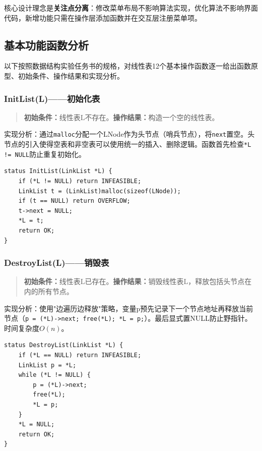 \documentclass[supercite]{Experimental_Report}
\begin{document}
核心设计理念是\textbf{关注点分离}：修改菜单布局不影响算法实现，优化算法不影响界面代码，新增功能只需在操作层添加函数并在交互层注册菜单项。

\subsection{基本功能函数分析}

以下按照数据结构实验任务书的规格，对线性表12个基本操作函数逐一给出函数原型、初始条件、操作结果和实现分析。

\subsubsection{InitList(L)——初始化表}

\begin{quote}\small
\textbf{初始条件：}线性表L不存在。\quad\textbf{操作结果：}构造一个空的线性表。
\end{quote}

实现分析：通过\texttt{malloc}分配一个LNode作为头节点（哨兵节点），将\texttt{next}置空。头节点的引入使得空表和非空表可以使用统一的插入、删除逻辑。函数首先检查\texttt{*L != NULL}防止重复初始化。

\begin{lstlisting}[label={lst:init}, caption={InitList}]
status InitList(LinkList *L) {
    if (*L != NULL) return INFEASIBLE;
    LinkList t = (LinkList)malloc(sizeof(LNode));
    if (t == NULL) return OVERFLOW;
    t->next = NULL;
    *L = t;
    return OK;
}
\end{lstlisting}



\subsubsection{DestroyList(L)——销毁表}


\begin{quote}\small
\textbf{初始条件：}线性表L已存在。\quad\textbf{操作结果：}销毁线性表L，释放包括头节点在内的所有节点。
\end{quote}

实现分析：使用"边遍历边释放"策略，变量p预先记录下一个节点地址再释放当前节点（\texttt{p = (*L)->next; free(*L); *L = p;}）。最后显式置NULL防止野指针。时间复杂度$O(n)$。

\begin{lstlisting}[label={lst:destroy}, caption={DestroyList}]
status DestroyList(LinkList *L) {
    if (*L == NULL) return INFEASIBLE;
    LinkList p = *L;
    while (*L != NULL) {
        p = (*L)->next;
        free(*L);
        *L = p;
    }
    *L = NULL;
    return OK;
}
\end{lstlisting}
\end{document}
